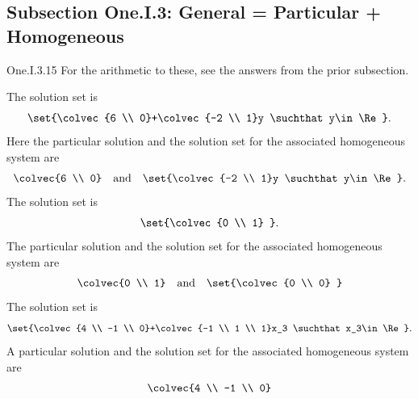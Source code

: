 \subsection{Subsection One.I.3: General = Particular + Homogeneous}
\begin{ans}{One.I.3.15}
      For the arithmetic to these, see the answers from the prior
      subsection.
      \begin{exparts}
        \partsitem
          The solution set is
          \begin{equation*}
            \set{\colvec{6 \\ 0}+\colvec{-2 \\ 1}y
              \suchthat y\in\Re}.
          \end{equation*}
          Here the particular solution and the solution set for the associated
          homogeneous system are
          \begin{equation*}
            \colvec{6 \\ 0}
              \quad\text{and}\quad
            \set{\colvec{-2 \\ 1}y
              \suchthat y\in\Re}.
          \end{equation*}
        \partsitem
          The solution set is
          \begin{equation*}
            \set{\colvec{0 \\ 1} }.
          \end{equation*}
          The particular solution and the solution set for the associated
          homogeneous system are
          \begin{equation*}
            \colvec{0 \\ 1}
              \quad\text{and}\quad
            \set{\colvec{0 \\ 0} }
          \end{equation*}
        \partsitem
          The solution set is
          \begin{equation*}
            \set{\colvec{4 \\ -1 \\ 0}+\colvec{-1 \\ 1 \\ 1}x_3
              \suchthat x_3\in\Re}.
          \end{equation*}
          A particular solution and the solution set for the associated
          homogeneous system are
          \begin{equation*}
            \colvec{4 \\ -1 \\ 0}

\end{equation*}
\end{exparts}
\end{ans}

